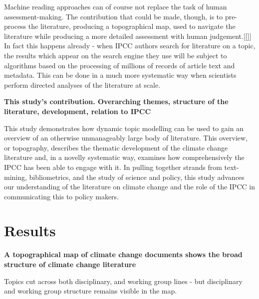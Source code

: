 \documentclass{article}
\begin{document}
\begin{linenumbers}
Machine reading approaches can of course not replace the task of human assessment-making. The contribution that could be made, though, is to pre-process the literature, producing a topographical map, used to navigate the literature while producing a more detailed assessment with human judgement.[[]] In fact this happens already - when IPCC authors search for literature on a topic, the results which appear on the search engine they use will be subject to algorithms based on the processing of millions of records of article text and metadata. This can be done in a much more systematic way when scientists perform directed analyses of the literature at scale.


\bigskip
\noindent\textbf{This study's contribution. Overarching themes, structure of the literature, development, relation to IPCC}

This study demonstrates how dynamic topic modelling can be used to gain an overview of an otherwise unmanageably large body of literature. This overview, or topography, describes the thematic development of the climate change literature and, in a novelly systematic way, examines how  comprehensively the IPCC has been able to engage with it. In pulling together strands from text-mining, bibliometrics, and the study of science and policy, this study advances our understanding of the literature on climate change and the role of the IPCC in communicating this to policy makers.


\section*{Results}

\bigskip
\noindent\textbf{A topographical map of climate change documents shows the broad structure of climate change literature}

Topics cut across both disciplinary, and working group lines - but disciplinary and working group structure remains visible in the map.


\end{linenumbers}
\end{document}
